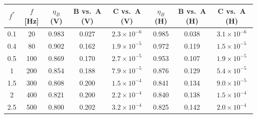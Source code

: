 \begin{tabular}{cccccccc}
\toprule
$f^*$ & $f$ [Hz] & $\eta_B$ (V) & B vs.\ A (V) & C vs.\ A (V) & $\eta_B$ (H) & B vs.\ A (H) & C vs.\ A (H) \\
\midrule
0.1 & 20 & 0.983 & 0.027 & $2.3\times 10^{-6}$ & 0.985 & 0.038 & $3.1\times 10^{-6}$ \\
0.4 & 80 & 0.902 & 0.162 & $1.9\times 10^{-5}$ & 0.972 & 0.119 & $1.5\times 10^{-5}$ \\
0.5 & 100 & 0.869 & 0.170 & $2.7\times 10^{-5}$ & 0.953 & 0.107 & $1.9\times 10^{-5}$ \\
1 & 200 & 0.854 & 0.188 & $7.9\times 10^{-5}$ & 0.876 & 0.129 & $5.4\times 10^{-5}$ \\
1.5 & 300 & 0.808 & 0.200 & $1.5\times 10^{-4}$ & 0.841 & 0.134 & $9.0\times 10^{-5}$ \\
2 & 400 & 0.821 & 0.200 & $2.2\times 10^{-4}$ & 0.840 & 0.138 & $1.5\times 10^{-4}$ \\
2.5 & 500 & 0.800 & 0.202 & $3.2\times 10^{-4}$ & 0.825 & 0.142 & $2.0\times 10^{-4}$ \\
\bottomrule
\end{tabular}
